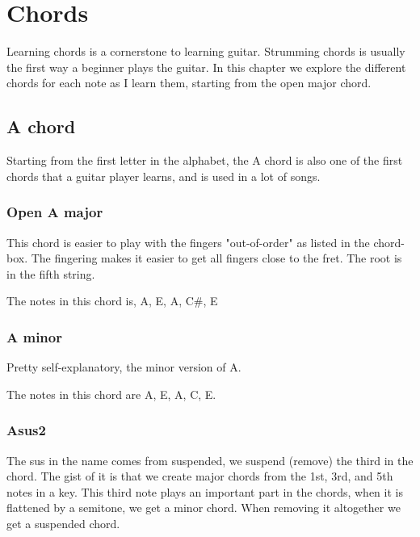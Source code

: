 \documentclass[11pt]{book}
\begin{document}
    \chapter{Chords}
    Learning chords is a cornerstone to learning guitar.
    Strumming chords is usually the first way a beginner plays the guitar.
    In this chapter we explore the different chords for each note as I learn them, starting from the open major chord.


    \section{A chord}
    Starting from the first letter in the alphabet, the A chord is also one of the first chords that a guitar player learns,
    and is used in a lot of songs.

    \subsection{Open A major}
    This chord is easier to play with the fingers "out-of-order" as listed in the chord-box.
    The fingering makes it easier to get all fingers close to the fret.
    The root is in the fifth string.

    \chordscheme[
        name   = A,
        finger = {2/4:2,2/3:1,2/2:3},
        ring   = {5,1},
        mute   = {6}
    ]

    The notes in this chord is, A, E, A, C\#, E

    \subsection{A minor}
    Pretty self-explanatory, the minor version of A.

    \chordscheme[
        name = Am,
        finger = {2/4:2, 2/3:3, 1/2:1},
        ring = {5,1},
        mute = {6}
    ]

    The notes in this chord are A, E, A, C, E.

    \subsection{Asus2}
    The sus in the name comes from suspended, we suspend (remove) the third in the chord.
    The gist of it is that we create major chords from the 1st, 3rd, and 5th notes in a key.
    This third note plays an important part in the chords, when it is flattened by a semitone, we get a minor chord.
    When removing it altogether we get a suspended chord.
\end{document}
